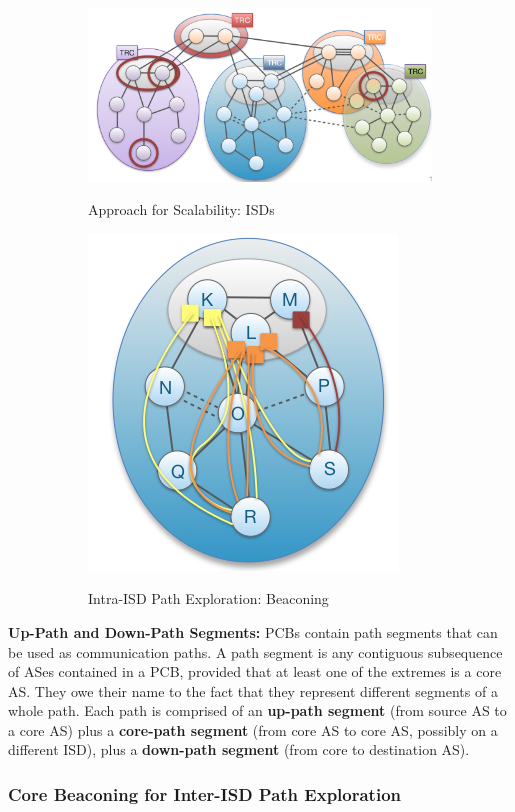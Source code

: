 \documentclass[11pt,oneside,a4paper]{article}
\begin{document}
\begin{figure}[hb]
	\centering
	\begin{subfigure}[t]{.5\textwidth}
		\centering
		\includegraphics[width=0.7\linewidth]{figures/scion_isd}
		\label{fig:scion_isd}
		\caption{Approach for Scalability: ISDs}
	\end{subfigure}%
	\begin{subfigure}[t]{.5\textwidth}
		\centering
		\includegraphics[width=0.4\linewidth]{figures/scion_beaconing}
		\label{fig:scion_beaconing}
		\caption{Intra-ISD Path Exploration: Beaconing}
	\end{subfigure}
	\caption{}
\end{figure}

\newpage

\textbf{Up-Path and Down-Path Segments:} PCBs contain path segments that
can be used as communication paths. A path segment is any contiguous subsequence of ASes contained in a PCB, provided that at least one of the extremes is a core AS. They owe their name to the fact that they represent different segments of a whole path. Each path is comprised of an \textbf{up-path segment} (from source AS to a core AS) plus a \textbf{core-path segment} (from core AS to core AS, possibly on a different ISD), plus a \textbf{down-path segment} (from core to destination AS).\\

\subsubsection{Core Beaconing for Inter-ISD Path Exploration}
\end{document}

